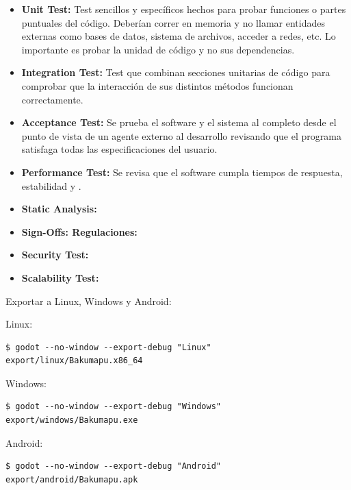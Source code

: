 \begin{itemize}
  \item \textbf{Unit Test:} Test sencillos y específicos hechos para probar funciones o partes puntuales del código. Deberían correr en memoria y no llamar entidades externas como bases de datos, sistema de archivos, acceder a redes, etc. Lo importante es probar la unidad de código y no sus dependencias.
  \item \textbf{Integration Test:} Test que combinan secciones unitarias de código para comprobar que la interacción de sus distintos métodos funcionan correctamente.
  \item \textbf{Acceptance Test:} Se prueba el software y el sistema al completo desde el punto de vista de un agente externo al desarrollo revisando que el programa satisfaga todas las especificaciones del usuario.
  \item \textbf{Performance Test:} Se revisa que el software cumpla tiempos de respuesta, estabilidad y .
  \item \textbf{Static Analysis:} 
  \item \textbf{Sign-Offs: Regulaciones:} 
  \item \textbf{Security Test:} 
  \item \textbf{Scalability Test:} 
\end{itemize}

Exportar a Linux, Windows y Android:

Linux:
\begin{lstlisting}
$ godot --no-window --export-debug "Linux" export/linux/Bakumapu.x86_64
\end{lstlisting}

Windows:
\begin{lstlisting}
$ godot --no-window --export-debug "Windows" export/windows/Bakumapu.exe
\end{lstlisting}

Android:
\begin{lstlisting}
$ godot --no-window --export-debug "Android" export/android/Bakumapu.apk
\end{lstlisting}
